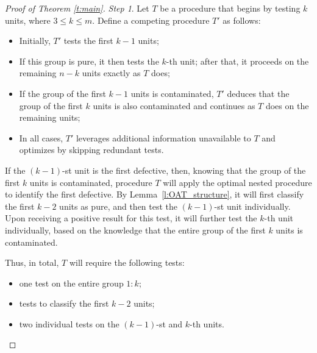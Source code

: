 \documentclass[12pt]{article}
\begin{document}
\begin{proof}[Proof of Theorem \ref{t:main}]
\emph{Step 1}. Let $T$ be a procedure that begins by testing $k$ units, where $3 \leq k \leq m$. Define a competing procedure $T'$ as follows:
\begin{itemize}
    \item Initially, $T'$ tests the first $k-1$ units;
    \item If this group is pure, it then tests the $k$-th unit; after that, it proceeds on the remaining $n - k$ units exactly as $T$ does;
    \item If the group of the first $k-1$ units is contaminated, $T'$ deduces that the group of the first $k$ units is also contaminated and continues as $T$ does on the remaining units;
    \item In all cases, $T'$ leverages additional information unavailable to $T$ and optimizes by skipping redundant tests.
\end{itemize}
If the $(k-1)$-st unit is the first defective, then, knowing that the group of the first $k$ units is contaminated, procedure $T$ will apply the optimal nested procedure to identify the first defective. By Lemma~\ref{l:OAT_structure}, it will first classify the first $k-2$ units as pure, and then test the $(k-1)$-st unit individually. Upon receiving a positive result for this test, it will further test the $k$-th unit individually, based on the knowledge that the entire group of the first $k$ units is contaminated.

Thus, in total, $T$ will require the following tests:
\begin{itemize}
    \item one test on the entire group $1{:}k$;
    \item tests to classify the first $k-2$ units;
    \item two individual tests on the $(k-1)$-st and $k$-th units.
\end{itemize}


\end{proof}
\end{document}
